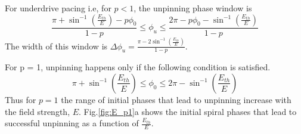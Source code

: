 For underdrive pacing i.e, for $p<1$, the unpinning phase window is 
\begin{equation}
\frac{\pi+ {\sin^{-1}}(\frac{E_{th}}{E})-p \phi_0}{1-p}   \leq \phi_u \leq \frac{2\pi-p \phi_0-{\sin^{-1}}(\frac{E_{th}}{E})}{1-p}
\label{eq:underdrive}
\end{equation}
The width of this window is $\Delta\phi_u = \frac{\pi - 2 \sin^{-1}(\frac{E_{th}}{E})}{1-p}$. 


For p = 1, unpinning happens only if the following condition is satisfied.
\begin{equation}
\pi+ \sin^{-1}(\frac{E_{th}}{E})  \leq \phi_0 \leq 2\pi-\sin^{-1}(\frac{E_{th}}{E})
\label{eq:p=1}
\end{equation} 
Thus for $p=1$ the range of initial phases that lead to
unpinning increase with the field strength, $E$. Fig.\ref{fig:E_p1}a shows the initial spiral
phases that lead to successful unpinning as a function of $\frac{E_{th}}{E}$.


